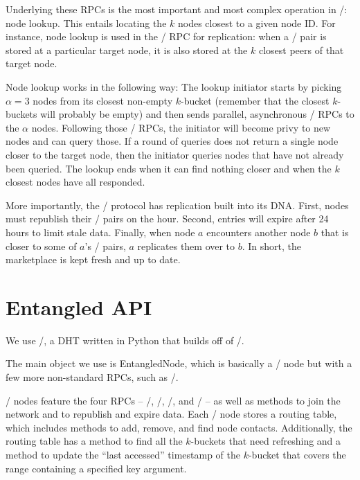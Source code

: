\documentclass[11pt,twocolumn]{article}
\begin{document}
Underlying these RPCs is the most important and most complex operation in \Kademlia/: node lookup.
This entails locating the $k$ nodes closest to a given node ID.
For instance, node lookup is used in the \store/ RPC for replication:
when a \kv/ pair is stored at a particular target node, it is also stored at the $k$ closest peers of that target node.

Node lookup works in the following way:
The lookup initiator starts by picking $\alpha = 3$ nodes from its closest non-empty $k$-bucket (remember that the closest $k$-buckets will probably be empty) and then sends parallel, asynchronous \findNode/ RPCs to the $\alpha$ nodes.
Following those \findNode/ RPCs, the initiator will become privy to new nodes and can query those.
If a round of queries does not return a single node closer to the target node, then the initiator queries nodes that have not already been queried.
The lookup ends when it can find nothing closer and when the $k$ closest nodes have all responded.

More importantly, the \Kademlia/ protocol has replication built into its DNA.
First, nodes must republish their \kv/ pairs on the hour.
Second, entries will expire after 24 hours to limit stale data.
Finally, when node $a$ encounters another node $b$ that is closer to some of $a$'s \kv/ pairs, $a$ replicates them over to $b$.
In short, the marketplace is kept fresh and up to date.






\section{Entangled API}
We use \Entangled/, a DHT written in Python that builds off of \Kademlia/.

The main object we use is {\sc EntangledNode}, which is basically a \Kademlia/ node but with a few more non-standard RPCs, such as \delete/.

\Kademlia/ nodes feature the four RPCs -- \ping/, \store/, \findValue/, and \findNode/ -- as well as methods to join the network and to republish and expire data.
Each \Kademlia/ node stores a routing table, which includes methods to add, remove, and find node contacts. Additionally, the routing table has a method to find all the $k$-buckets that need refreshing and a method to update the ``last accessed'' timestamp of the $k$-bucket that covers the range containing a specified key argument.
\end{document}

